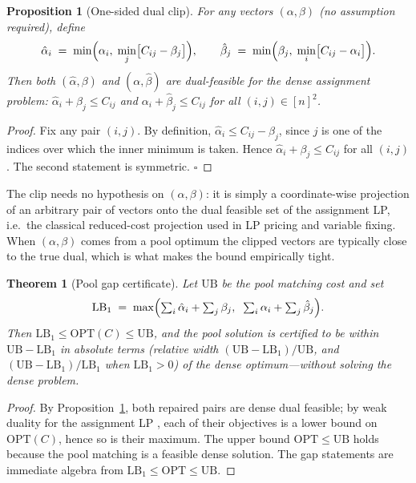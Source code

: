 \documentclass[11pt]{article}
\newtheorem{theorem}{Theorem}
\newtheorem{proposition}{Proposition}
\theoremstyle{remark}
\begin{document}
\begin{proposition}[One-sided dual clip]
\label{prop:repair}
For any vectors $(\alpha,\beta)$ (no assumption required), define
\[
\hat\alpha_i \;=\; \min\Bigl(\alpha_i,\; \min_j \bigl[C_{ij}-\beta_j\bigr]\Bigr),
\qquad
\hat\beta_j \;=\; \min\Bigl(\beta_j,\; \min_i \bigl[C_{ij}-\alpha_i\bigr]\Bigr).
\]
Then both $(\hat\alpha,\beta)$ and $(\alpha,\hat\beta)$ are dual-feasible
for the \emph{dense} assignment problem:
$\hat\alpha_i+\beta_j\le C_{ij}$ and $\alpha_i+\hat\beta_j\le C_{ij}$ for
\emph{all} $(i,j)\in[n]^2$.
\end{proposition}
\begin{proof}
Fix any pair $(i,j)$. By definition,
$\hat\alpha_i\le C_{ij}-\beta_j$, since $j$ is one of the indices over
which the inner minimum is taken. Hence
$\hat\alpha_i+\beta_j\le C_{ij}$ for all $(i,j)$. The second statement is
symmetric. $\square$
\end{proof}

\noindent The clip needs no hypothesis on $(\alpha,\beta)$: it is simply a
coordinate-wise projection of an arbitrary pair of vectors onto the dual
feasible set of the assignment LP, i.e.\ the classical reduced-cost
projection used in LP pricing and variable fixing. When $(\alpha,\beta)$
comes from a pool optimum the clipped vectors are typically close to the
true dual, which is what makes the bound empirically tight.

\begin{theorem}[Pool gap certificate]
\label{thm:cert}
Let $\mathrm{UB}$ be the pool matching cost and set
\begin{equation}
\label{eq:lb1}
\mathrm{LB}_1 \;=\; \max\Bigl(
\textstyle\sum_i\hat\alpha_i+\sum_j\beta_j,\;\;
\sum_i\alpha_i+\sum_j\hat\beta_j
\Bigr).
\end{equation}
Then $\mathrm{LB}_1\le \mathrm{OPT}(C)\le \mathrm{UB}$, and the pool
solution is certified to be within $\mathrm{UB}-\mathrm{LB}_1$ in absolute
terms (relative width $(\mathrm{UB}-\mathrm{LB}_1)/\mathrm{UB}$, and
$(\mathrm{UB}-\mathrm{LB}_1)/\mathrm{LB}_1$ when $\mathrm{LB}_1>0$) of the
dense optimum---without solving the dense problem.
\end{theorem}
\begin{proof}
By Proposition~\ref{prop:repair}, both repaired pairs are dense dual
feasible; by weak duality for the assignment LP \cite{schrijver2003}, each
of their objectives is a lower bound on $\mathrm{OPT}(C)$, hence so is
their maximum. The upper bound $\mathrm{OPT}\le\mathrm{UB}$ holds because
the pool matching is a feasible dense solution. The gap statements are
immediate algebra from $\mathrm{LB}_1\le\mathrm{OPT}\le\mathrm{UB}$.
\end{proof}
\end{document}
